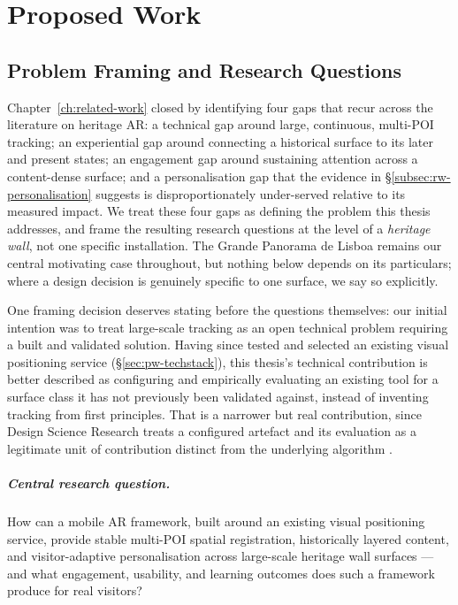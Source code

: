 %



\chapter{Proposed Work}
\label{ch:proposed-work}
 
\section{Problem Framing and Research Questions}
\label{sec:pw-problem-rq}
 
Chapter~\ref{ch:related-work} closed by identifying four gaps that recur
across the literature on heritage AR: a technical gap around large,
continuous, multi-POI tracking; an experiential gap around connecting a
historical surface to its later and present states; an engagement gap
around sustaining attention across a content-dense surface; and a
personalisation gap that the evidence in \S\ref{subsec:rw-personalisation}
suggests is disproportionately under-served relative to its measured
impact. We treat these four gaps as defining the problem this thesis
addresses, and frame the resulting research questions at the level of a
\emph{heritage wall}, not one specific installation. The Grande
Panorama de Lisboa remains our central motivating case throughout, but
nothing below depends on its particulars; where a design decision is
genuinely specific to one surface, we say so explicitly.
 
One framing decision deserves stating before the questions
themselves: our initial intention was to treat large-scale tracking as
an open technical problem requiring a built and validated solution.
Having since tested and selected an existing visual positioning service
(\S\ref{sec:pw-techstack}), this thesis's technical contribution is
better described as configuring and empirically evaluating an existing
tool for a surface class it has not previously been validated against,
instead of inventing tracking from first principles. That is a narrower but
real contribution, since Design Science Research treats a
configured artefact and its evaluation as a legitimate unit of
contribution distinct from the underlying algorithm \cite{hevner2004}.
 
\paragraph{Central research question.} How can a mobile AR framework, built
around an existing visual positioning service, provide stable multi-POI
spatial registration, historically layered content, and visitor-adaptive
personalisation across large-scale heritage wall surfaces — and what
engagement, usability, and learning outcomes does such a framework produce
for real visitors?
 
